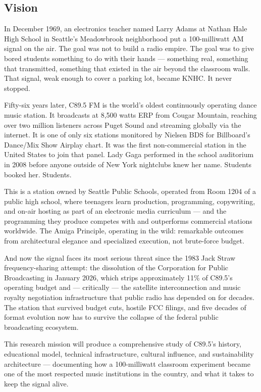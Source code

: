 \documentclass[11pt,letterpaper]{article}
\begin{document}
\subsection{Vision}

In December 1969, an electronics teacher named Larry Adams at Nathan Hale High School in Seattle's Meadowbrook neighborhood put a 100-milliwatt AM signal on the air. The goal was not to build a radio empire. The goal was to give bored students something to do with their hands --- something real, something that transmitted, something that existed in the air beyond the classroom walls. That signal, weak enough to cover a parking lot, became KNHC. It never stopped.

Fifty-six years later, C89.5 FM is the world's oldest continuously operating dance music station. It broadcasts at 8,500 watts ERP from Cougar Mountain, reaching over two million listeners across Puget Sound and streaming globally via the internet. It is one of only six stations monitored by Nielsen BDS for Billboard's Dance/Mix Show Airplay chart. It was the first non-commercial station in the United States to join that panel. Lady Gaga performed in the school auditorium in 2008 before anyone outside of New York nightclubs knew her name. Students booked her. Students.

This is a station owned by Seattle Public Schools, operated from Room 1204 of a public high school, where teenagers learn production, programming, copywriting, and on-air hosting as part of an electronic media curriculum --- and the programming they produce competes with and outperforms commercial stations worldwide. The Amiga Principle, operating in the wild: remarkable outcomes from architectural elegance and specialized execution, not brute-force budget.

And now the signal faces its most serious threat since the 1983 Jack Straw frequency-sharing attempt: the dissolution of the Corporation for Public Broadcasting in January 2026, which strips approximately 11\% of C89.5's operating budget and --- critically --- the satellite interconnection and music royalty negotiation infrastructure that public radio has depended on for decades. The station that survived budget cuts, hostile FCC filings, and five decades of format evolution now has to survive the collapse of the federal public broadcasting ecosystem.

This research mission will produce a comprehensive study of C89.5's history, educational model, technical infrastructure, cultural influence, and sustainability architecture --- documenting how a 100-milliwatt classroom experiment became one of the most respected music institutions in the country, and what it takes to keep the signal alive.
\end{document}
